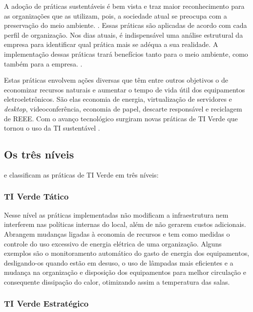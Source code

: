 A adoção de práticas sustentáveis é bem vista e traz maior reconhecimento para as organizações que as utilizam, pois, a sociedade atual se preocupa com a preservação do meio ambiente. \cite{abreu2012ti}. Essas práticas são aplicadas de acordo com cada perfil de organização. Nos dias atuais, é indispensável uma análise estrutural da empresa para identificar qual prática mais se adéqua a sua realidade. A implementação dessas práticas trará benefícios tanto para o meio ambiente, como também para a empresa. \cite{pinto2011estudo}.

Estas práticas envolvem ações diversas que têm entre outros objetivos o de economizar recursos naturais e aumentar o tempo de vida útil dos equipamentos eletroeletrônicos. São elas economia de energia, virtualização de servidores e \textit{desktop}, videoconferência, economia de papel, descarte responsável e reciclagem de REEE. Com o avanço tecnológico surgiram novas práticas de TI Verde que tornou o uso da TI sustentável \cite[p. 8]{pinto2011estudo}.

\subsection{Os três níveis}

 e  classificam as práticas de TI Verde em três níveis:

\subsubsection{TI Verde Tático}

Nesse nível as práticas implementadas não modificam a infraestrutura nem interferem nas políticas internas do local, além de não gerarem custos adicionais. Abrangem mudanças ligadas à economia de recursos e tem como medidas o controle do uso excessivo de energia elétrica de uma organização. Alguns exemplos são o monitoramento automático do gasto de energia dos equipamentos, desligando-os quando estão em desuso, o uso de lâmpadas mais eficientes e a mudança na organização e disposição dos equipamentos para melhor circulação e consequente dissipação do calor, otimizando assim a temperatura das salas.

\subsubsection{TI Verde Estratégico}

